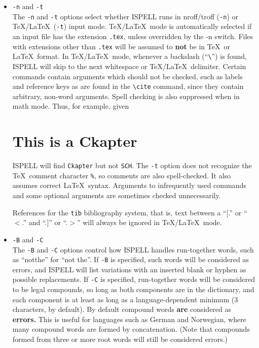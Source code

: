 \documentclass[noabs,nolof,twoside,11pt]{starlink}
\begin{document}
\begin{itemize}
\item {\Large\tt -n} and {\Large\tt -t}\\
The \verb+-n+ and \verb+-t+ options select whether ISPELL runs in nroff/troff
(\verb+-n+) or \TeX /\LaTeX\ (\verb+-t+) input mode.
\TeX /\LaTeX\ mode is automatically selected if an input file has the extension
\verb+.tex+, unless overridden by the -n switch.
Files with extensions other than \verb+.tex+ will be assumed to \textbf{not} be in
\TeX\ or \LaTeX\ format.
In \TeX /\LaTeX\ mode, whenever a backslash (``\verb+\+'') is found, ISPELL
will skip to the next whitespace or \TeX /\LaTeX\ delimiter.
Certain commands contain arguments which should not be checked, such as labels
and reference keys as are found in the \verb+\cite+ command, since they contain
arbitrary, non-word arguments.
Spell checking is also suppressed when in math mode.
Thus, for example, given

\begin{terminalv}
\chapter {This is a Ckapter} \cite{SCH86}
\end{terminalv}

ISPELL will find \verb+Ckapter+ but not \verb+SCH+\@.
The \verb+-t+ option does not recognize the \TeX\ comment character \verb+%+,
so comments are also spell-checked.
It also assumes correct \LaTeX\ syntax.
Arguments to infrequently used commands and some optional arguments are
sometimes checked unnecessarily.

References for the \verb+tib+ bibliography system, that is, text between a
``[.'' or ``$<$.'' and ``.]'' or ``.$>$'' will always be ignored in \TeX /\LaTeX\
mode.

\item {\Large\tt -B} and {\Large\tt -C} \\
The \verb+-B+ and \verb+-C+ options control how ISPELL handles run-together
words, such as ``notthe'' for ``not the''\@.
If \verb+-B+ is specified, such words will be considered as errors, and
ISPELL will list variations with an inserted blank or hyphen as possible
replacements.
If \verb+-C+ is specified, run-together words will be considered to be legal
compounds, so long as both components are in the dictionary, and each component
is at least as long as a language-dependent minimum (3 characters, by default).
By default compound words \textbf{are} considered as \textbf{errors.}
This is useful for languages such as German and Norwegian, where many compound
words are formed by concatenation.
(Note that compounds formed from three or more root words will still be
considered errors.)


\end{itemize}
\end{document}
